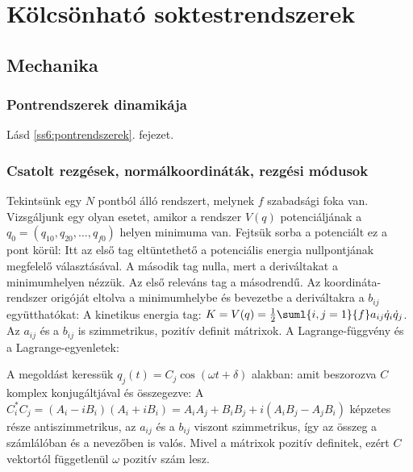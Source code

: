\chapter{K\"olcs\"onhat\'o soktestrendszerek}
 
 \section{Mechanika} 
  
  \subsection{Pontrendszerek dinamikája}
   
   Lásd \ref{ss6:pontrendszerek}. fejezet. 
   
  \subsection{Csatolt rezgések, normálkoordináták, rezgési módusok}
   
   Tekintsünk egy $N$ pontból álló rendszert, melynek $f$ szabadsági foka van.
   Vizsgáljunk egy olyan esetet, amikor a rendszer $V(q)$ potenciáljának a $q_0=(q_{10},q_{20},\dots,q_{f0})$ helyen minimuma van.
   Fejtsük sorba a potenciált ez a pont körül:
   Itt az első tag eltüntethető a potenciális energia nullpontjának megfelelő választásával.
   A második tag nulla, mert a deriváltakat a minimumhelyen nézzük.
   Az első releváns tag a másodrendű.
   Az koordináta-rendszer origóját eltolva a minimumhelybe és bevezetbe a deriváltakra a $b_{ij}$ együtthatókat:
   A kinetikus energia tag: $K=V(q)=\frac{1}{2}\suml{i,j=1}{f}a_{ij} \dot{q}_i \dot{q}_j$.
   Az $a_{ij}$ és a $b_{ij}$ is szimmetrikus, pozitív definit mátrixok.
   A Lagrange-függvény és a Lagrange-egyenletek:
   
   A megoldást keressük $q_j(t)=C_j\cos(\omega t+\delta)$ alakban:
   amit beszorozva $C$ komplex konjugáltjával és összegezve:
   A $C_i^* C_j=(A_i-iB_i)(A_i+iB_i)=A_iA_j+B_iB_j+i(A_iB_j-A_jB_i)$ képzetes része antiszimmetrikus, az $a_{ij}$ és a $b_{ij}$ viszont szimmetrikus, így az összeg a számlálóban és a nevezőben is valós.
   Mivel a mátrixok pozitív definitek, ezért $C$ vektortól függetlenül $\omega$ pozitív szám lesz. 
   
